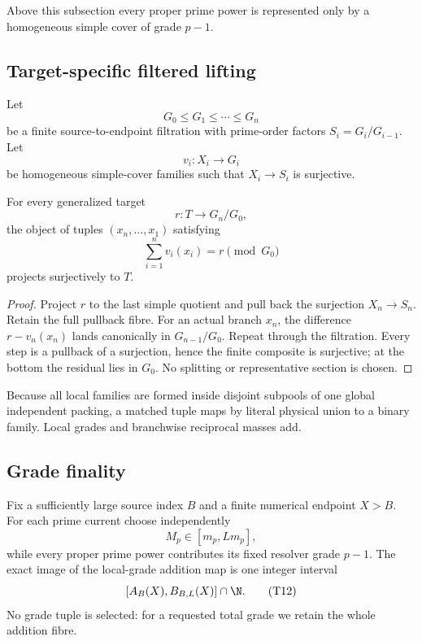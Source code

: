 Above this subsection every proper prime power is represented only by a
homogeneous simple cover of grade $p-1$.

\subsection{Target-specific filtered lifting}

Let
\[
G_0\le G_1\le\cdots\le G_n
\]
be a finite source-to-endpoint filtration with prime-order factors
$S_i=G_i/G_{i-1}$.  Let
\[
v_i:X_i\to G_i
\]
be homogeneous simple-cover families such that $X_i\to S_i$ is surjective.

\begin{lemma}\label{lem:targeted-filtered-lifting}
For every generalized target
\[
r:T\to G_n/G_0,
\]
the object of tuples $(x_n,\ldots,x_1)$ satisfying
\[
\sum_{i=1}^n v_i(x_i)=r\pmod{G_0}
\tag{T11}\label{eq:targeted-match}
\]
projects surjectively to $T$.
\end{lemma}

\begin{proof}
Project $r$ to the last simple quotient and pull back the surjection
$X_n\to S_n$.  Retain the full pullback fibre.  For an actual branch $x_n$,
the difference $r-v_n(x_n)$ lands canonically in $G_{n-1}/G_0$.  Repeat
through the filtration.  Every step is a pullback of a surjection, hence the
finite composite is surjective; at the bottom the residual lies in $G_0$.
No splitting or representative section is chosen.
\end{proof}

Because all local families are formed inside disjoint subpools of one global
independent packing, a matched tuple maps by literal physical union to a binary
family.  Local grades and branchwise reciprocal masses add.

\subsection{Grade finality}

Fix a sufficiently large source index $B$ and a finite numerical endpoint
$X>B$.  For each prime current choose independently
\[
M_p\in[m_p,Lm_p],
\]
while every proper prime power contributes its fixed resolver grade $p-1$.
The exact image of the local-grade addition map is one integer interval
\[
[A_B(X),B_{B,L}(X)]\cap\N.
\tag{T12}\label{eq:r14-grade-interval}
\]
No grade tuple is selected: for a requested total grade we retain the whole
addition fibre.


